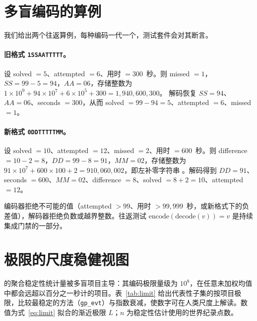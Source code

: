\section{多盲编码的算例}
\label{app:multi}

我们给出两个往返算例，每种编码一代一个，测试套件会对其断言。

\paragraph{旧格式 \texttt{1SSAATTTTT}。}设 solved $=5$、attempted $=6$、用时 $=300$~秒。则 missed $=1$，$SS = 99-5 = 94$，$AA = 06$，存储整数为
$1\!\times\!10^{9} + 94\!\times\!10^{7} + 6\!\times\!10^{5} + 300
= 1{,}940{,}600{,}300$。
解码恢复 $SS=94$、$AA=06$、seconds $=300$，从而 solved $=99-94=5$、attempted $=6$、missed $=1$。

\paragraph{新格式 \texttt{0DDTTTTTMM}。}设 solved $=10$、attempted $=12$、missed $=2$、用时 $=600$~秒。则 difference $=10-2=8$，$DD = 99-8 = 91$，$MM = 02$，存储整数为
$91\!\times\!10^{7} + 600\!\times\!100 + 2 = 910{,}060{,}002$，即左补零字符串 。解码得到 $DD=91$、seconds $=600$、$MM=02$、difference $=8$、solved $=8+2=10$、attempted $=12$。

编码器拒绝不可能的值（attempted $>99$、用时 $>99{,}999$~秒，或新格式下的负差值），解码器拒绝负数或越界整数。往返测试 $\mathrm{encode}(\mathrm{decode}(v)) = v$ 是持续集成门禁的一部分。

\section{ 极限的尺度稳健视图}
\label{app:limit}

 的聚合稳定性统计量被多盲项目主导：其编码极限量级为 $10^{8}$，在任意未加权均值中都会远超以百分之一秒计的项目。表~\ref{tab:limit} 给出代表性子集的按项目极限，比较最稳定的方法（\texttt{gp\_evt}）与指数衰减，使数字可在人类尺度上解读。数值为式~\ref{eq:limit} 拟合的渐近极限 $L$；$n$ 为稳定性估计使用的世界纪录点数。

